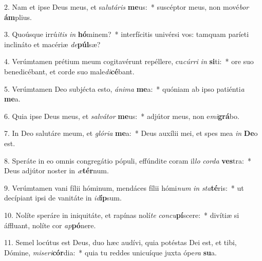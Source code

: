2. Nam et ipse Deus meus, et sa\textit{lu}\textit{tá}\textit{ris} \textbf{me}us:~*  suscéptor meus, non mové\textit{bor} \textbf{ám}plius.\

3. Quoúsque irrú\textit{i}\textit{tis} \textit{in} \textbf{hó}minem?~*  interfícitis univérsi vos: tamquam paríeti inclináto et macériæ \textit{de}\textbf{púl}sæ?\

4. Verúmtamen prétium meum cogitavérunt repéllere, cu\textit{cúr}\textit{ri} \textit{in} \textbf{si}ti:~*  ore suo benedicébant, et corde suo male\textit{di}\textbf{cé}bant.\

5. Verúmtamen Deo subjécta esto, \textit{á}\textit{ni}\textit{ma} \textbf{me}a:~*  quóniam ab ipso patiénti\textit{a} \textbf{me}a.\

6. Quia ipse Deus meus, et \textit{sal}\textit{vá}\textit{tor} \textbf{me}us:~*  adjútor meus, non e\textit{mi}\textbf{grá}bo.\

7. In Deo salutáre meum, et \textit{gló}\textit{ri}\textit{a} \textbf{me}a:~*  Deus auxílii mei, et spes mea \textit{in} \textbf{De}o est.\

8. Speráte in eo omnis congregátio pópuli, effúndite coram il\textit{lo} \textit{cor}\textit{da} \textbf{ves}tra:~*  Deus adjútor noster in \textit{æ}\textbf{tér}num.\

9. Verúmtamen vani fílii hóminum, mendáces fílii hómi\textit{num} \textit{in} \textit{sta}\textbf{té}ris:~*  ut decípiant ipsi de vanitáte in \textit{id}\textbf{íp}sum.\

10. Nolíte speráre in iniquitáte, et rapínas nolí\textit{te} \textit{con}\textit{cu}\textbf{pí}scere:~*  divítiæ si áffluant, nolíte cor \textit{ap}\textbf{pó}nere.\

11. Semel locútus est Deus, duo hæc audívi, quia potéstas Dei est, et tibi, Dómine, \textit{mi}\textit{se}\textit{ri}\textbf{cór}dia:~*  quia tu reddes unicuíque juxta ópe\textit{ra} \textbf{su}a.\

